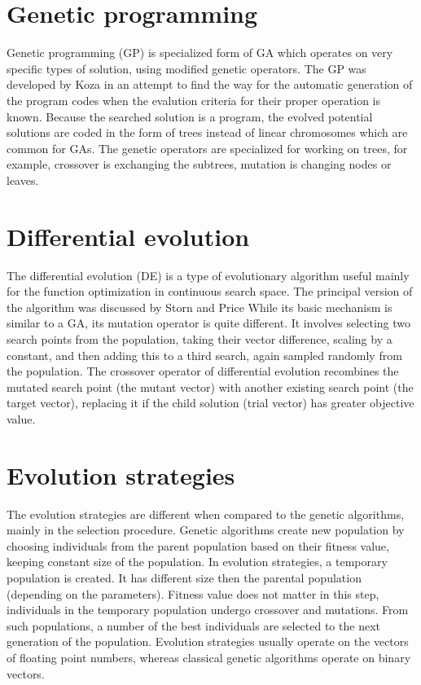 \documentclass[twoside]{ctuthesis}
\theoremstyle{plain}
\theoremstyle{definition}
\theoremstyle{note}
\begin{document}
\section{Genetic programming}
Genetic programming (GP) is specialized form of GA which operates on very specific types of solution, using modified genetic operators. The GP was developed by Koza \cite{koza1992genetic} in an attempt to find the way for the automatic generation of the program codes when the evalution criteria for their proper operation is known. Because the searched solution is a program, the evolved potential solutions are coded in the form of trees instead of linear chromosomes which are common for GAs. The genetic operators are specialized for working on trees, for example, crossover is exchanging the subtrees, mutation is changing nodes or leaves.

\section{Differential evolution}
The differential evolution (DE) is a type of evolutionary algorithm useful mainly for the function optimization in continuous search space. The principal version of the algorithm was discussed by Storn and Price \cite{storn1997differential} While its basic mechanism is similar to a GA, its mutation operator is quite different. It involves selecting two search points from the population, taking their vector difference, scaling by a constant, and then adding this to a third search, again sampled randomly from the population. The crossover operator of differential evolution recombines the mutated search point (the mutant vector) with another existing search point (the target vector), replacing it if the child solution (trial vector) has greater objective value.

\section{Evolution strategies}
The evolution strategies are different when compared to the genetic algorithms, mainly in the selection procedure. Genetic algorithms create new population by choosing individuals from the parent population based on their fitness value, keeping constant size of the population. In evolution strategies, a temporary population is created. It has different size then the parental population (depending on the parameters). Fitness value does not matter in this step, individuals in the temporary population undergo crossover and mutations. From such populations, a number of the best individuals are selected to the next generation of the population. Evolution strategies usually operate on the vectors of floating point numbers, whereas classical genetic algorithms operate on binary vectors.
\end{document}
